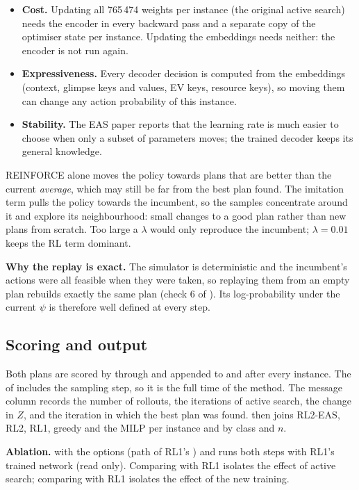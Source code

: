 \begin{whybox}[title=Why the embeddings and not the whole network]
\begin{itemize}
  \item \textbf{Cost.} Updating all 765\,474 weights per instance (the original active search) needs the encoder in every backward pass and a separate copy of the optimiser state per instance. Updating the embeddings needs neither: the encoder is not run again.
  \item \textbf{Expressiveness.} Every decoder decision is computed from the embeddings (context, glimpse keys and values, EV keys, resource keys), so moving them can change any action probability of this instance.
  \item \textbf{Stability.} The EAS paper reports that the learning rate is much easier to choose when only a subset of parameters moves; the trained decoder keeps its general knowledge.
\end{itemize}
\end{whybox}

\begin{whybox}[title=Why the imitation term]
REINFORCE alone moves the policy towards plans that are better than the current \emph{average}, which may still be far from the best plan found. The imitation term pulls the policy towards the incumbent, so the samples concentrate around it and explore its neighbourhood: small changes to a good plan rather than new plans from scratch. Too large a $\lambda$ would only reproduce the incumbent; $\lambda=0.01$ keeps the RL term dominant.
\end{whybox}

\textbf{Why the replay is exact.} The simulator is deterministic and the incumbent's actions were all feasible when they were taken, so replaying them from an empty plan rebuilds exactly the same plan (check 6 of ). Its log-probability under the current $\psi$ is therefore well defined at every step.

\subsection{Scoring and output}

Both plans are scored by  through  and appended to  and  after every instance. The  of  includes the sampling step, so it is the full time of the method. The message column records the number of rollouts, the iterations of active search, the change in $Z$, and the iteration in which the best plan was found.  then joins RL2-EAS, RL2, RL1, greedy and the MILP per instance and by class and $n$.

\textbf{Ablation.}  with the options  (path of RL1's ) and  runs both steps with RL1's trained network (read only). Comparing  with RL1 isolates the effect of active search; comparing  with RL1 isolates the effect of the new training.
